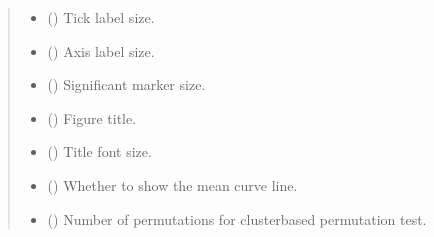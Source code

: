 \documentclass[letterpaper,10pt,english]{sphinxhowto}
\begin{document}
\begin{fulllineitems}
\begin{quote}
\begin{description}
\begin{itemize}
\item {} 
\sphinxAtStartPar
{} (\sphinxstyleliteralemphasis{\sphinxupquote{, }}) \textendash{} Tick label size.

\item {} 
\sphinxAtStartPar
{} (\sphinxstyleliteralemphasis{\sphinxupquote{, }}) \textendash{} Axis label size.

\item {} 
\sphinxAtStartPar
{} (\sphinxstyleliteralemphasis{\sphinxupquote{, }}) \textendash{} Significant marker size.

\item {} 
\sphinxAtStartPar
{} (\sphinxstyleliteralemphasis{\sphinxupquote{, }}) \textendash{} Figure title.

\item {} 
\sphinxAtStartPar
{} (\sphinxstyleliteralemphasis{\sphinxupquote{, }}) \textendash{} Title font size.

\item {} 
\sphinxAtStartPar
{} (\sphinxstyleliteralemphasis{\sphinxupquote{, }}) \textendash{} Whether to show the mean curve line.

\item {} 
\sphinxAtStartPar
{} (\sphinxstyleliteralemphasis{\sphinxupquote{, }}) \textendash{} Number of permutations for cluster\sphinxhyphen{}based permutation test.


\end{itemize}
\end{description}
\end{quote}
\end{fulllineitems}
\end{document}
